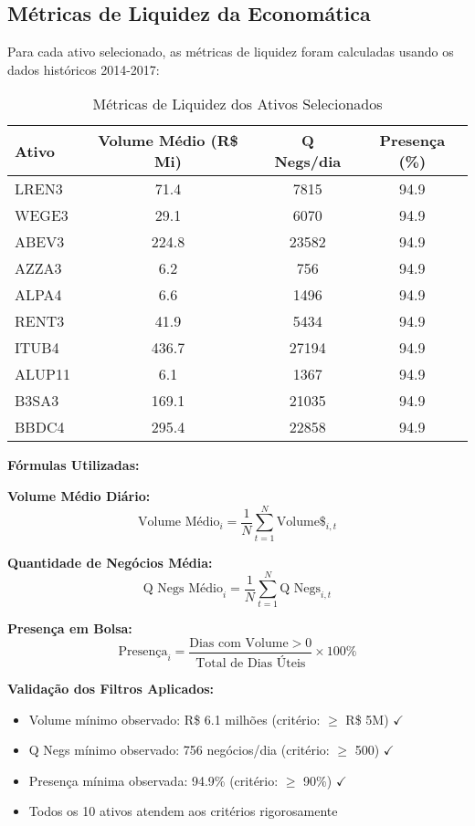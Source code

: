 \subsection{Métricas de Liquidez da Economática}

Para cada ativo selecionado, as métricas de liquidez foram calculadas usando os dados históricos 2014-2017:

\begin{table}[H]
\centering
\caption{Métricas de Liquidez dos Ativos Selecionados}
\begin{tabular}{|l|c|c|c|}
\hline
\textbf{Ativo} & \textbf{Volume Médio (R\$ Mi)} & \textbf{Q Negs/dia} & \textbf{Presença (\%)} \\
\hline
LREN3 & 71.4 & 7815 & 94.9 \\
WEGE3 & 29.1 & 6070 & 94.9 \\
ABEV3 & 224.8 & 23582 & 94.9 \\
AZZA3 & 6.2 & 756 & 94.9 \\
ALPA4 & 6.6 & 1496 & 94.9 \\
RENT3 & 41.9 & 5434 & 94.9 \\
ITUB4 & 436.7 & 27194 & 94.9 \\
ALUP11 & 6.1 & 1367 & 94.9 \\
B3SA3 & 169.1 & 21035 & 94.9 \\
BBDC4 & 295.4 & 22858 & 94.9 \\
\hline
\end{tabular}
\end{table}

\textbf{Fórmulas Utilizadas:}

\textbf{Volume Médio Diário:}
\begin{equation}
\text{Volume Médio}_i = \frac{1}{N} \sum_{t=1}^{N} \text{Volume}\$_{i,t}
\end{equation}

\textbf{Quantidade de Negócios Média:}
\begin{equation}
\text{Q Negs Médio}_i = \frac{1}{N} \sum_{t=1}^{N} \text{Q Negs}_{i,t}
\end{equation}

\textbf{Presença em Bolsa:}
\begin{equation}
\text{Presença}_i = \frac{\text{Dias com Volume} > 0}{\text{Total de Dias Úteis}} \times 100\%
\end{equation}

\textbf{Validação dos Filtros Aplicados:}
\begin{itemize}
    \item Volume mínimo observado: R\$ 6.1 milhões (critério: $\geq$ R\$ 5M) $\checkmark$
    \item Q Negs mínimo observado: 756 negócios/dia (critério: $\geq$ 500) $\checkmark$
    \item Presença mínima observada: 94.9\% (critério: $\geq$ 90\%) $\checkmark$
    \item Todos os 10 ativos atendem aos critérios rigorosamente
\end{itemize}

